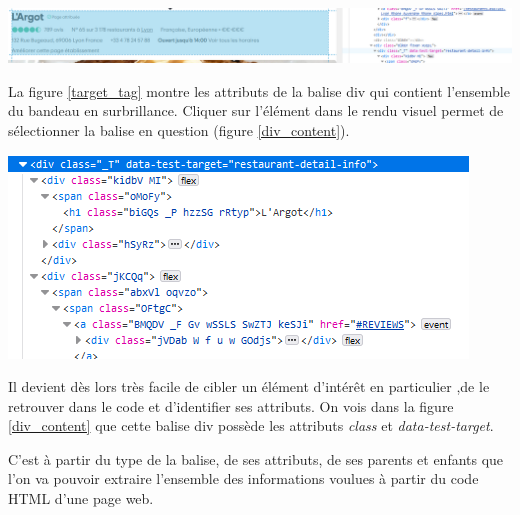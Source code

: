 \begin{center}
\includegraphics[scale=0.8]{Images/targeting_tag.png}
\label{target_tag}
\end{center}

La figure \ref{target_tag} montre les attributs de la balise div qui contient l'ensemble du bandeau en surbrillance. Cliquer sur l'élément dans le rendu visuel permet de sélectionner la balise en question (figure \ref{div_content}).

\begin{center}
\includegraphics[scale=0.8]{Images/div_content.png}
\label{div_content}
\end{center}

Il devient dès lors très facile de cibler un élément d'intérêt en particulier ,de le retrouver dans le code et d'identifier ses attributs. On vois dans la figure \ref{div_content} que cette balise div possède les attributs \textit{class} et \textit{data-test-target}.

C'est à partir du type de la balise, de ses attributs, de ses parents et enfants que l'on va pouvoir extraire l'ensemble des informations voulues à partir du code HTML d'une page web.

